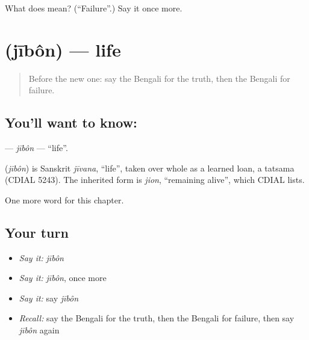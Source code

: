 \begin{tcolorbox}[breakable,colback=teal!4,colframe=teal!35!black,title={Before you move on}]
What does  mean? (\textquotedblleft{}Failure\textquotedblright{}.) Say it once more.
\end{tcolorbox}
\section[\texorpdfstring{\bn{জীবন} (jībôn)}{জীবন (jībôn)}]{ (jībôn) — life}

\label{lesson:BN-C228-jibon}



\begin{quote}
Before the new one: say the Bengali for the truth, then the Bengali for failure.
\end{quote}

\subsection*{You'll want to know: }
\textbf{} — \emph{jībôn} — \textquotedblleft{}life\textquotedblright{}.

\begin{cousinweb}
\textbf{} (\emph{jībôn}) is Sanskrit \emph{jīvana}, \textquotedblleft{}life\textquotedblright{}, taken over whole as a learned loan, a tatsama (CDIAL 5243). The inherited form is \emph{jion}, \textquotedblleft{}remaining alive\textquotedblright{}, which CDIAL lists.
\end{cousinweb}

\begin{grammarlens}[title={What you've built}]
One more word for this chapter.
\end{grammarlens}

\subsection*{Your turn}
\begin{itemize}
\raggedright
  \item \emph{Say it:} \emph{jībôn}
  \item \emph{Say it:} \emph{jībôn}, once more
  \item \emph{Say it:} say \emph{jībôn}
  \item \emph{Recall:} say the Bengali for the truth, then the Bengali for failure, then say \emph{jībôn} again
\end{itemize}

